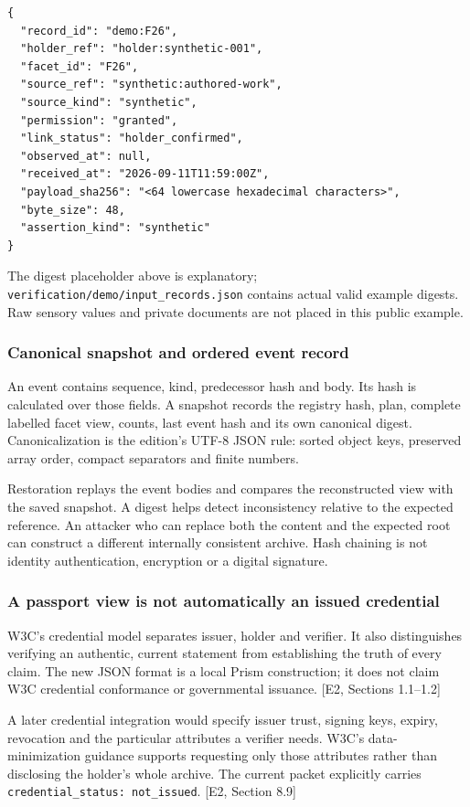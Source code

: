 \documentclass[11pt,a4paper]{article}
\newcommand{\source}[1]{{\sffamily\small\color{slate}[#1]}}
\begin{document}
\begin{lstlisting}
{
  "record_id": "demo:F26",
  "holder_ref": "holder:synthetic-001",
  "facet_id": "F26",
  "source_ref": "synthetic:authored-work",
  "source_kind": "synthetic",
  "permission": "granted",
  "link_status": "holder_confirmed",
  "observed_at": null,
  "received_at": "2026-09-11T11:59:00Z",
  "payload_sha256": "<64 lowercase hexadecimal characters>",
  "byte_size": 48,
  "assertion_kind": "synthetic"
}
\end{lstlisting}
The digest placeholder above is explanatory; \texttt{verification/demo/input\_records.json} contains actual valid example digests. Raw sensory values and private documents are not placed in this public example.

\subsubsection{Canonical snapshot and ordered event record}
An event contains sequence, kind, predecessor hash and body. Its hash is calculated over those fields. A snapshot records the registry hash, plan, complete labelled facet view, counts, last event hash and its own canonical digest. Canonicalization is the edition's UTF-8 JSON rule: sorted object keys, preserved array order, compact separators and finite numbers.

Restoration replays the event bodies and compares the reconstructed view with the saved snapshot. A digest helps detect inconsistency relative to the expected reference. An attacker who can replace both the content and the expected root can construct a different internally consistent archive. Hash chaining is not identity authentication, encryption or a digital signature.

\subsubsection{A passport view is not automatically an issued credential}
W3C's credential model separates issuer, holder and verifier. It also distinguishes verifying an authentic, current statement from establishing the truth of every claim. The new JSON format is a local Prism construction; it does not claim W3C credential conformance or governmental issuance. \source{E2, Sections 1.1--1.2}

A later credential integration would specify issuer trust, signing keys, expiry, revocation and the particular attributes a verifier needs. W3C's data-minimization guidance supports requesting only those attributes rather than disclosing the holder's whole archive. The current packet explicitly carries \texttt{credential\_status: not\_issued}. \source{E2, Section 8.9}
\end{document}
